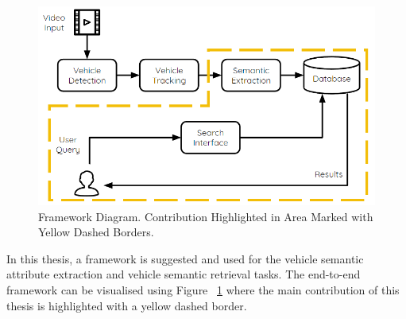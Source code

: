 \begin{figure}[hbt!]\centering
\includegraphics[width=.9\textwidth]{image/new/framework_new.PNG}
\caption{Framework Diagram. Contribution Highlighted in Area Marked with Yellow Dashed Borders.}
\label{fig:framework}
\end{figure}

In this thesis, a framework is suggested and used for the vehicle semantic attribute extraction and vehicle semantic retrieval tasks. The end-to-end framework can be visualised using Figure ~\ref{fig:framework} where the main contribution of this thesis is highlighted with a yellow dashed border.

